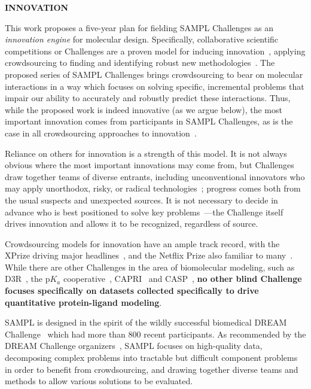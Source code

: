 \documentclass[11pt]{article}
\begin{document}

{\Large \bf INNOVATION}

This work proposes a five-year plan for fielding SAMPL Challenges as an \emph{innovation engine} for molecular design.
Specifically, collaborative scientific competitions or Challenges are a proven model for inducing innovation~\cite{Saez-Rodriguez:2016:NatRevGenet, Kay:2011:R&DManage, Eisenstein:2013:NatBiotech}, applying crowdsourcing to finding and identifying robust new methodologies~\cite{Saez-Rodriguez:2016:NatRevGenet}. 
The proposed series of SAMPL Challenges brings crowdsourcing to bear on molecular interactions in a way which focuses on solving specific, incremental problems that impair our ability to accurately and robustly predict these interactions.
Thus, while the proposed work is indeed innovative (as we argue below), the most important innovation comes from participants in SAMPL Challenges, as is the case in all crowdsourcing approaches to innovation~\cite{Saez-Rodriguez:2016:NatRevGenet, Kay:2011:R&DManage}.

Reliance on others for innovation is a strength of this model. 
It is not always obvious where the most important innovations may come from, but Challenges draw together teams of diverse entrants, including unconventional innovators who may apply unorthodox, risky, or radical technologies~\cite{Kay:2011:R&DManage, Saez-Rodriguez:2016:NatRevGenet}; progress comes both from the usual suspects and unexpected sources.
It is not necessary to decide in advance who is best positioned to solve key problems~\cite{Saez-Rodriguez:2016:NatRevGenet}---the Challenge itself drives innovation and allows it to be recognized, regardless of source.

Crowdsourcing models for innovation have an ample track record, with the XPrize driving major headlines~\cite{::XPRIZE, Kay:2011:R&DManage, XPrize:2017:Wikipedia}, and the Netflix Prize also familiar to many~\cite{Bell:2010:CHANCE}. 
While there are other Challenges in the area of biomolecular modeling, such as D3R~\cite{Gathiaka:2016:JComputAidedMolDes}, the p$K_a$ cooperative~\cite{Nielsen:2011:Proteins}, CAPRI~\cite{Janin:2005:ProteinScience} and CASP~\cite{Moult:2014:Proteins},
\textbf{no other blind Challenge focuses specifically on datasets collected specifically to drive quantitative protein-ligand modeling}.

SAMPL is designed in the spirit of the wildly successful biomedical DREAM Challenge~\cite{Prill:2011:Sci.Signal., Eisenstein:2013:NatBiotech, Saez-Rodriguez:2016:NatRevGenet} which had more than 800 recent participants. 
As recommended by the DREAM Challenge organizers~\cite{Saez-Rodriguez:2016:NatRevGenet}, SAMPL focuses on high-quality data, decomposing complex problems into tractable but difficult component problems in order to benefit from crowdsourcing, and drawing together diverse teams and methods to allow various solutions to be evaluated.
\end{document}
